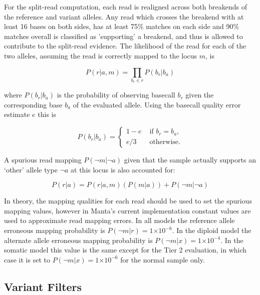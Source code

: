 \documentclass{article}
\newcommand{\e}[1]{\ensuremath{\times 10^{#1}}}
\begin{document}
For the split-read computation, each read is realigned across both breakends of the reference and variant alleles. Any read which crosses the breakend with at least 16 bases on both sides, has at least 75\% matches on each side and 90\% matches overall is classified as 'supporting' a breakend, and thus is allowed to contribute to the split-read evidence. The likelihood of the read for each of the two alleles, assuming the read is correctly mapped to the locus $m$, is

\begin{equation*}
P (r \vert a,m) = \prod_{b_r \in r} P(b_r \vert b_a)
\end{equation*}

\noindent
where $P(b_r \vert b_a)$ is the probability of observing basecall $b_r$ given the corresponding base $b_a$ of the evaluated allele. Using the basecall quality error estimate $e$ this is

\begin{equation*}
P(b_r \vert b_a) =
\left\{
\begin{array}{rl}
1-e & \mbox{ if $b_r=b_a$,} \\
e/3 & \mbox{ otherwise.}
\end{array}
\right.
\end{equation*}

A spurious read mapping $P(\neg m \vert \neg a)$ given that the sample actually supports an `other' allele type $\neg a$ at this locus is also accounted for:

\begin{equation*}
P ( r \vert a) = P ( r \vert a,m ) (P(m \vert a))  + P (\neg m \vert \neg a)
\end{equation*}

In theory, the mapping qualities for each read should be used to set the spurious mapping values, however in Manta's current implementation constant values are used to approximate read mapping errors.  In all models the reference allele erroneous mapping probability is $P(\neg m \vert r) =  1\e{-6}$. In the diploid model the alternate allele erroneous mapping probability is $P(\neg m \vert x) =  1\e{-4}$. In the somatic model this value is the same except for the Tier 2 evaluation, in which case it is set to $P(\neg m \vert x) =  1\e{-6}$ for the normal sample only.





\subsection{Variant Filters}
\end{document}
